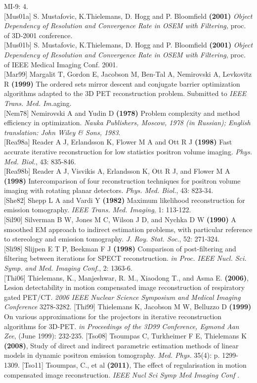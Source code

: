 \documentclass{article}
\begin{document}
MI-9: 4.\\
{[}Mus01a{]} S. Mustafovic, K.Thielemans, D. Hogg and P. Bloomfield \textbf{(2001)} 
\textit{Object Dependency of Resolution and Convergence Rate in OSEM 
with Filtering,} proc. of 3D-2001 conference.\\
{[}Mus01b{]} S. Mustafovic, K.Thielemans, D. Hogg and P. Bloomfield \textbf{(2001)} \textit{Object 
Dependency of Resolution and Convergence Rate in OSEM with Filtering}, 
proc. of IEEE Medical Imaging Conf. 2001.\\
{[}Mar99{]} Margalit T, Gordon E, Jacobson M, Ben-Tal A, Nemirovski 
A, Levkovitz R \textbf{(1999)} The ordered sets mirror descent and 
conjugate barrier optimization algorithms adapted to the 3D PET 
reconstruction problem. Submitted to \textit{IEEE Trans. Med. Im.}aging.\\
{[}Nem78{]} Nemirovski A and Yudin D \textbf{(1978)} Problem complexity 
and method efficiency in optimization. \textit{Nauka Publishers, 
Moscow, 1978 (in Russian); English translation: John Wiley \& 
Sons, 1983}.\\
{[}Rea98a{]} Reader A J, Erlandsson K, Flower M A and Ott R J \textbf{(1998)} 
Fast accurate iterative reconstruction for low statistics positron 
volume imaging. \textit{Phys. Med. Biol.}, 43: 835-846.\\
{[}Rea98b{]} Reader A J, Visvikis A, Erlandsson K, Ott R J, and Flower 
M A \textbf{(1998)} Intercomparison of four reconstruction techniques 
for positron volume imaging with rotating planar detectors. \textit{Phys. 
Med. Biol.}, 43: 823-34.\\
{[}She82{]} Shepp L A and Vardi Y \textbf{(1982)} Maximum likelihood reconstruction 
for emission tomography. \textit{IEEE Trans. Med. Imaging}, 1: 113-122.\\
{[}Sil90{]} Silverman B W, Jones M C, Wilson J D, and Nychka D W \textbf{(1990)} 
A smoothed EM approach to indirect estimation problems, with 
particular reference to stereology and emission tomography. \textit{J. 
Roy. Stat. Soc}., 52: 271-324.\\
{[}Sli98{]} Slijpen E T P, Beekman F J \textbf{(1998)} Comparison of post-filtering 
and filtering between iterations for SPECT reconstruction. \textit{in 
Proc. IEEE Nucl. Sci. Symp. and Med. Imaging Conf.}, 2: 1363-6.\\
{[}Thi06{]} Thielemans, K., Manjeshwar, R. M., Xiaodong T., and Asma E.
\textbf{(2006)}, Lesion detectability in motion compensated
image reconstruction of respiratory gated PET/CT. \textit { 2006 IEEE
Nuclear Science Symposium and Medical Imaging Conference} 3278-3282.
{[}Thi99{]} Thielemans K, Jacobson M W, Belluzzo D \textbf{(1999)} On 
various approximations for the projectors in iterative reconstruction 
algorithms for 3D-PET. \textit{in Proceedings of the 3D99 Conference, 
Egmond Aan Zee}, (June 1999): 232-235.
{[}Tso08{]} Tsoumpas C, Turkheimer F E, Thielemans K \textbf{(2008)},
Study of direct and indirect parametric estimation methods of linear
models in dynamic positron emission tomography. \textit{Med. Phys.} 35(4):
p. 1299-1309.
{[}Tso11{]} Tsoumpas, C., et al \textbf{(2011)}, The effect of
regularisation in motion compensated image reconstruction. \textit { IEEE
Nucl Sci Symp Med Imaging Conf }.
\end{document}
